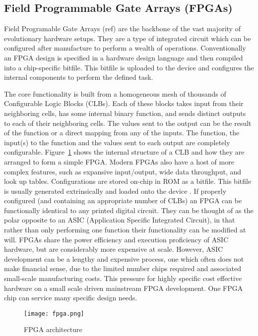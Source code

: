 \subsection{Field Programmable Gate Arrays (FPGAs) \label{ss:FPGAs}}
Field Programable Gate Arrays (\todo ref) are the backbone of the vast majority of evolutionary
hardware setups. They are a type of integrated circuit which can be
configured after manufacture to perform a wealth of operations. Conventionally
an FPGA design is specified in a hardware design language and then compiled into a chip-specific bitfile.
This bitfile is uploaded to the device and configures the internal components
to perform the defined task.

The core functionality is built from a homogeneous mesh of
thousands of Configurable Logic Blocks (CLBs).
Each of these blocks takes input from their
neighboring cells, has some internal binary function, and sends distinct outputs
to each of their neighboring cells. The values sent to the output can be the
result of the function or a direct mapping from any of the inputs. The function, the input(s) to the function
and the values sent to each output are completely configurable. Figure~\ref{fig:fpga}
shows the internal structure of a CLB and how they are arranged to form a simple FPGA.
Modern FPGAs also have a host of more complex features, such as expansive input/output,
wide data throughput, and look up tables.
Configurations are stored on-chip in ROM as a bitfile. This bitfile is usually generated
extrinsically \cite{10.1007/978-3-540-46239-2_5} and loaded onto the device \cite{Kuon:2008:FAS:1454695.1454696}.
If properly configured (and containing an appropriate number of CLBs) an FPGA can
be functionally identical to any printed digital circuit. They can be thought of
as the polar opposite to an ASIC (Application Specific Integrated Circuit), in that
rather than only performing one function their functionality can be modified at will.
FPGAs share the power efficiency and execution proficiency of ASIC hardware, but
are considerably more expensive at scale. However, ASIC development can
be a lengthy and expensive process, one which often does not make financial sense,
due to the limited number chips required and associated small-scale manufacturing
costs. This pressure for highly specific cost effective hardware on a small scale
driven mainstream FPGA development. One FPGA chip can service many specific
design needs.

\begin{figure}
\centering
\texttt{[image: fpga.png]}
\caption{FPGA architecture}
\label{fig:fpga}
\end{figure}

